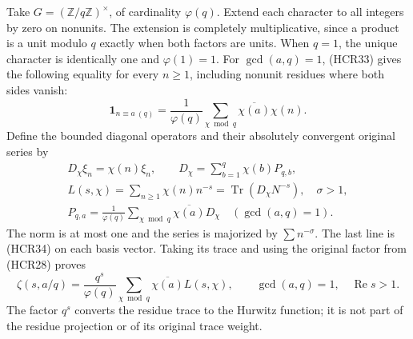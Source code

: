 Take $G=(\mathbb Z/q\mathbb Z)^\times$, of cardinality
$\varphi(q)$. Extend each character to all integers
by zero on nonunits. The extension is completely
multiplicative, since a product is a unit modulo $q$
exactly when both factors are units. When $q=1$,
the unique character is identically one and
$\varphi(1)=1$. For $\gcd(a,q)=1$, (HCR33) gives
the following equality for every $n\ge1$, including
nonunit residues where both sides vanish:
\begin{equation}\tag{HCR34}
 \mathbf1_{n\equiv a\ (q)}
    =\frac1{\varphi(q)}\sum_{\chi\bmod q}
                                \overline{\chi(a)}\chi(n).
\end{equation}
Define the bounded diagonal operators and their
absolutely convergent original series by
\begin{equation}\tag{HCR35}
\begin{gathered}
 D_\chi\xi_n=\chi(n)\xi_n,
 \qquad D_\chi=\sum_{b=1}^q\chi(b)P_{q,b},\\
 L(s,\chi)=\sum_{n\ge1}\chi(n)n^{-s}
                       =\operatorname{Tr}(D_\chi N^{-s}),\quad\sigma>1,\\
 P_{q,a}=\frac1{\varphi(q)}\sum_{\chi\bmod q}
                            \overline{\chi(a)}D_\chi
                         \quad(\gcd(a,q)=1).
\end{gathered}
\end{equation}
The norm is at most one and the series is majorized by
$\sum n^{-\sigma}$. The last line is (HCR34) on each
basis vector. Taking its trace and using the original
factor from (HCR28) proves
\begin{equation}\tag{HCR36}
 \boxed{\zeta(s,a/q)=\frac{q^s}{\varphi(q)}
       \sum_{\chi\bmod q}\overline{\chi(a)}L(s,\chi),
        \qquad\gcd(a,q)=1,\quad\operatorname{Re}s>1.}
\end{equation}
The factor $q^s$ converts the residue trace to the
Hurwitz function; it is not part of the residue
projection or of its original trace weight.

